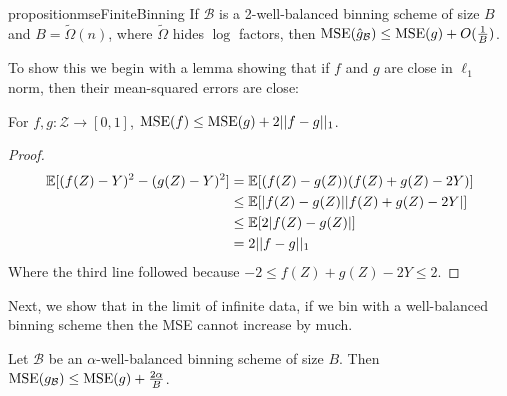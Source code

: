 \begin{restatable}{proposition}{mseFiniteBinning}
\label{prop:mse-finite-binning}
If $\mathcal{B}$ is a 2-well-balanced binning scheme of size $B$ and $B = \widetilde{\Omega}(n)$, where $\widetilde{\Omega}$ hides $\log$ factors, then $\textup{MSE}(\hat{g}_{\mathcal{B}}) \leq \textup{MSE}(g) + O(\frac{1}{B})$.
\end{restatable}

To show this we begin with a lemma showing that if $f$ and $g$ are close in $\ell_1$ norm, then their mean-squared errors are close:

\begin{lemma}
\label{lem:mse-l1}
For $f, g : \mathcal{Z} \to [0, 1]$, $\textup{MSE}(f) \leq \textup{MSE}(g) + 2||f - g||_1$.
\end{lemma}

\begin{proof}
\begin{align*}
\mathbb{E}[(f(Z) - Y)^2 - (g(Z) - Y)^2] &= \mathbb{E}[(f(Z) - g(Z))(f(Z) + g(Z) - 2Y)] \\
&\leq \mathbb{E}[|f(Z) - g(Z)||f(Z) + g(Z) - 2Y|] \\
&\leq \mathbb{E}[2|f(Z) - g(Z)|] \\
& =2||f-g||_1
\end{align*}
Where the third line followed because $-2 \leq f(Z) + g(Z) - 2Y \leq 2$.
\end{proof}

Next, we show that in the limit of infinite data, if we bin with a well-balanced binning scheme then the MSE cannot increase by much.

\begin{lemma}
\label{thm:bin-sharpness}
Let $\mathcal{B}$ be an $\alpha$-well-balanced binning scheme of size $B$. Then $\textup{MSE}(g_{\mathcal{B}}) \leq \textup{MSE}(g) + \frac{2\alpha}{B}$.
\end{lemma}

